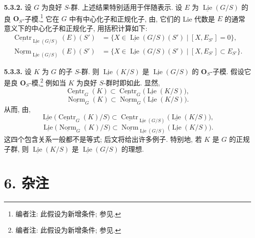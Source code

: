 \medskip
\noindent{}\textbf{5.3.2.}
设 \(G\) 为良好 \(S\)-群. 上述结果特别适用于伴随表示.
设 \(E\) 为 \(\underline{\operatorname{Lie}}(G/S)\) 的良
\(\mathbf O_S\)-子模.\footnote{编者注: 此假设为新增条件; 参见.} 它在 \(G\) 中有中心化子和正规化子,
由, 它们的 Lie 代数是
\(E\) 的通常意义下的中心化子和正规化子, 用括积计算如下:
\[
\begin{split}
 \underline{\operatorname{Centr}}_
   {\underline{\operatorname{Lie}}(G/S)}(E)(S')
 &=\{X\in\underline{\operatorname{Lie}}(G/S)(S')
       \mid[X,E_{S'}]=0\},\\
 \underline{\operatorname{Norm}}_
   {\underline{\operatorname{Lie}}(G/S)}(E)(S')
 &=\{X\in\underline{\operatorname{Lie}}(G/S)(S')
       \mid[X,E_{S'}]\subset E_{S'}\}.
\end{split}
\]

\medskip
\noindent{}\textbf{5.3.3.}
设 \(K\) 为 \(G\) 的子 \(S\)-群. 则
\(\underline{\operatorname{Lie}}(K/S)\) 是
\(\underline{\operatorname{Lie}}(G/S)\) 的
\(\mathbf O_S\)-子模. 假设它是良 \(\mathbf O_S\)-模,\footnote{编者注: 此假设为新增条件; 参见.} 例如当 \(K\) 为良好 \(S\)-群时即如此. 显然,
\[
 \underline{\operatorname{Centr}}_G(K)
 \subset
 \underline{\operatorname{Centr}}_G
   \bigl(\underline{\operatorname{Lie}}(K/S)\bigr),
\]
\[
 \underline{\operatorname{Norm}}_G(K)
 \subset
 \underline{\operatorname{Norm}}_G
   \bigl(\underline{\operatorname{Lie}}(K/S)\bigr).
\]
从而, 由,
\[
 \underline{\operatorname{Lie}}
   \bigl(\underline{\operatorname{Centr}}_G(K)/S\bigr)
 \subset
 \underline{\operatorname{Centr}}_
   {\underline{\operatorname{Lie}}(G/S)}
   \bigl(\underline{\operatorname{Lie}}(K/S)\bigr),
\]
\[
 \underline{\operatorname{Lie}}
   \bigl(\underline{\operatorname{Norm}}_G(K)/S\bigr)
 \subset
 \underline{\operatorname{Norm}}_
   {\underline{\operatorname{Lie}}(G/S)}
   \bigl(\underline{\operatorname{Lie}}(K/S)\bigr).
\]
这四个包含关系一般都不是等式; 后文将给出许多例子.
特别地, 若 \(K\) 是 \(G\) 的正规子群,
则 \(\underline{\operatorname{Lie}}(K/S)\) 是
\(\underline{\operatorname{Lie}}(G/S)\) 的理想.

\section*{6. 杂注}

